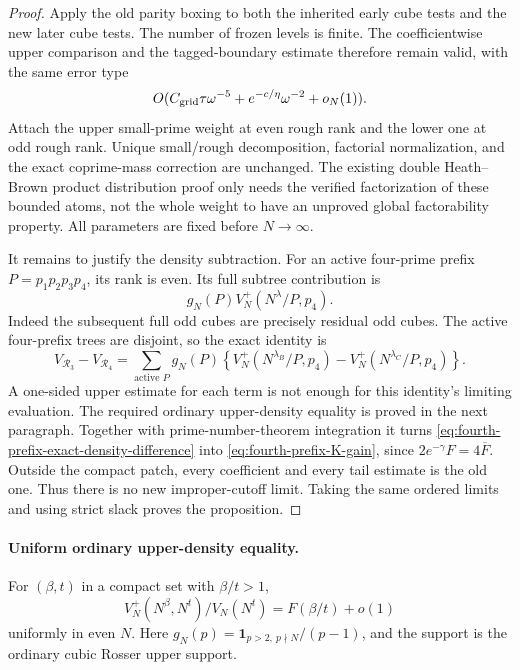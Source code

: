 \begin{proof}
Apply the old parity boxing to both the inherited early cube tests
and the new later cube tests. The number of frozen levels is finite.
The coefficientwise upper comparison and the tagged-boundary estimate
therefore remain valid, with the same error type
\[
 O(C_{\rm grid}\tau\omega^{-5}
        +e^{-c/\eta}\omega^{-2}+o_N(1)).
\]
Attach the upper small-prime weight at even rough rank and the lower
one at odd rough rank. Unique small/rough decomposition, factorial
normalization, and the exact coprime-mass correction are unchanged.
The existing double Heath--Brown product distribution proof only
needs the verified factorization of these bounded atoms, not the
whole weight to have an unproved global factorability property.
All parameters are fixed before \(N\to\infty\).

It remains to justify the density subtraction.
For an active four-prime prefix \(P=p_1p_2p_3p_4\), its rank is even.
Its full subtree contribution is
\[
 g_N(P)V_N^+(N^\lambda/P,p_4).
\]
Indeed the subsequent full odd cubes are precisely residual odd cubes.
The active four-prefix trees are disjoint, so the exact identity is
\begin{equation}\label{eq:fourth-prefix-exact-density-difference}
 V_{\mathcal R_3}-V_{\mathcal R_4}
 =\sum_{\text{active }P}g_N(P)
 \left\{V_N^+(N^{\lambda_B}/P,p_4)
              -V_N^+(N^{\lambda_C}/P,p_4)\right\}.
\end{equation}
A one-sided upper estimate for each term is not enough for this
identity's limiting evaluation. The required ordinary upper-density
equality is proved in the next paragraph.
Together with prime-number-theorem integration it turns
\eqref{eq:fourth-prefix-exact-density-difference} into
\eqref{eq:fourth-prefix-K-gain}, since
\(2e^{-\gamma}F=4\overline F\).
Outside the compact patch, every coefficient and every tail estimate
is the old one. Thus there is no new improper-cutoff limit.
Taking the same ordered limits and using strict slack proves the
proposition.
\end{proof}

\paragraph{Uniform ordinary upper-density equality.}
For \((\beta,t)\) in a compact set with \(\beta/t>1\),
\[
 V_N^+(N^\beta,N^t)/V_N(N^t)=F(\beta/t)+o(1)
\]
uniformly in even \(N\). Here \(g_N(p)=
\mathbf1_{p>2,\ p\nmid N}/(p-1)\), and the support is the ordinary
cubic Rosser upper support.

